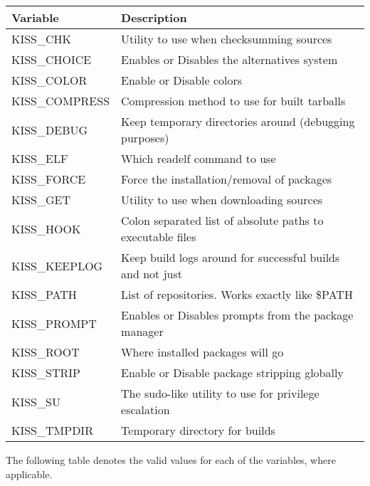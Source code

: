 \documentclass{article}
\begin{document}
\pagebreak
\begin{center}
\begin{table}[]
\begin{tabular}{|l|l|}
  \hline
  Variable & Description \\ \hline
  KISS\_CHK      & Utility to use when checksumming sources \\
  KISS\_CHOICE   & Enables or Disables the alternatives system \\
  KISS\_COLOR    & Enable or Disable colors \\
  KISS\_COMPRESS & Compression method to use for built tarballs \\
  KISS\_DEBUG    & Keep temporary directories around (debugging purposes) \\
  KISS\_ELF      & Which readelf command to use \\
  KISS\_FORCE    & Force the installation/removal of packages \\
  KISS\_GET      & Utility to use when downloading sources \\
  KISS\_HOOK     & Colon separated list of absolute paths to executable files \\
  KISS\_KEEPLOG  & Keep build logs around for successful builds and not just \\
  KISS\_PATH     & List of repositories. Works exactly like \$PATH \\
  KISS\_PROMPT   & Enables or Disables prompts from the package manager \\
  KISS\_ROOT     & Where installed packages will go \\
  KISS\_STRIP    & Enable or Disable package stripping globally \\
  KISS\_SU       & The sudo-like utility to use for privilege escalation \\
  KISS\_TMPDIR   & Temporary directory for builds \\
  \hline
\end{tabular}
\end{table}
\end{center}

The following table denotes the valid values for each of the
variables, where applicable.
\end{document}
